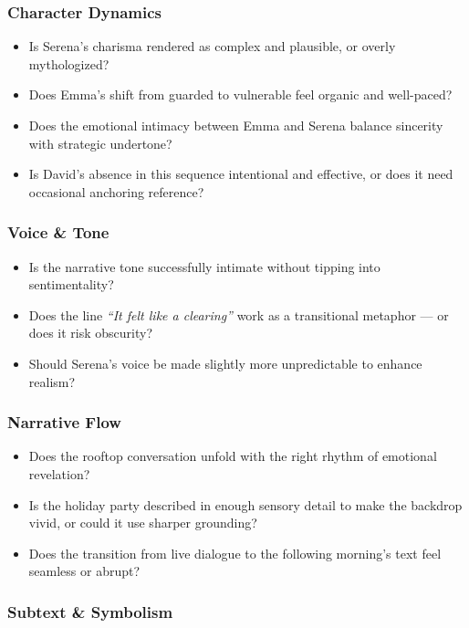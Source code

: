 \subsubsection*{Character Dynamics}

\begin{itemize}
  \item Is Serena's charisma rendered as complex and plausible, or overly mythologized?
  \item Does Emma’s shift from guarded to vulnerable feel organic and well-paced?
  \item Does the emotional intimacy between Emma and Serena balance sincerity with strategic undertone?
  \item Is David’s absence in this sequence intentional and effective, or does it need occasional anchoring reference?
\end{itemize}

\subsubsection*{Voice \& Tone}

\begin{itemize}
  \item Is the narrative tone successfully intimate without tipping into sentimentality?
  \item Does the line \textit{``It felt like a clearing''} work as a transitional metaphor — or does it risk obscurity?
  \item Should Serena’s voice be made slightly more unpredictable to enhance realism?
\end{itemize}

\subsubsection*{Narrative Flow}

\begin{itemize}
  \item Does the rooftop conversation unfold with the right rhythm of emotional revelation?
  \item Is the holiday party described in enough sensory detail to make the backdrop vivid, or could it use sharper grounding?
  \item Does the transition from live dialogue to the following morning’s text feel seamless or abrupt?
\end{itemize}

\subsubsection*{Subtext \& Symbolism}

